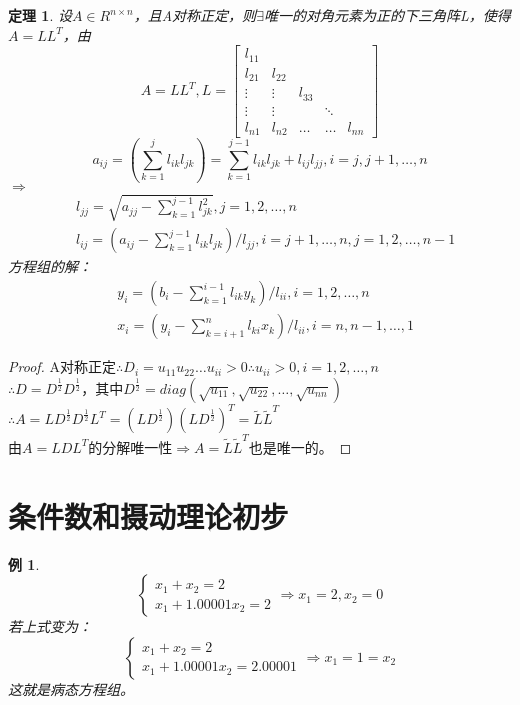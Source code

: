 \documentclass[a4paper]{article}
\newtheorem{theorem}{定理}[section]
\newtheorem{example}{例}[section]
\begin{document}
\begin{theorem}
  设$A\in R^{n\times n}$，且A对称正定，则$\exists$唯一的对角元素为正的下三角阵L，使得$A=LL^T$，由
  $$A=LL^T, L = \left[
    \begin{matrix}
      l_{11} \\
      l_{21} & l_{22} \\
      \vdots & \vdots & l_{33} \\
      \vdots & \vdots & &\ddots \\
      l_{n1} & l_{n2} & \dots & \dots & l_{nn}
    \end{matrix}
    \right]$$
  $$a_{ij}=(\sum_{k=1}^jl_{ik}l_{jk})=\sum^{j-1}_{k=1}l_{ik}l_{jk}+l_{ij}l_{jj}, i=j,j+1,\dots,n $$
  $\Rightarrow$
  \begin{align}
    &l_{jj} = \sqrt{a_{jj}-\sum^{j-1}_{k=1}l^2_{jk}}, j=1,2,\dots, n \\
    &l_{ij} = (a_{ij}-\sum^{j-1}_{k=1}l_{ik}l_{jk})/l_{jj}, i=j+1, \dots, n, j=1,2, \dots, n-1 
  \end{align}
  方程组的解：
  \begin{align}
    &y_i = (b_i-\sum^{i-1}_{k=1}l_{ik}y_k)/l_{ii}, i=1,2,\dots, n \\
    &x_i = (y_i-\sum^n_{k=i+1}l_{ki}x_k)/l_{ii}, i=n,n-1,\dots, 1
  \end{align}
\end{theorem}

\begin{proof}
  A对称正定$\therefore D_i=u_{11}u_{22}\dots u_{ii}>0 \therefore u_{ii}>0, i=1,2,\dots,n $ \\
  $\therefore D = D^\frac{1}{2}D^\frac{1}{2}$，其中$D^\frac{1}{2} = diag(\sqrt{u_{11}}, \sqrt{u_{22}}, \dots, \sqrt{u_{nn}}) $ \\
  $\therefore A= LD^\frac{1}{2}D^\frac{1}{2}L^T = (LD^\frac{1}{2})(LD^\frac{1}{2})^T = \widetilde{L}\widetilde{L}^T $\\
  由$A=LDL^T$的分解唯一性$\Rightarrow A=\widetilde{L}\widetilde{L}^T$也是唯一的。
\end{proof}

\section{条件数和摄动理论初步}
\begin{example}
  $$\left\{
    \begin{array}{lr}
      x_1 + x_2=2\\
      x_1+1.00001x_2=2
    \end{array}
    \right.
    \Rightarrow x_1=2, x_2=0$$
    若上式变为：
    $$
    \left\{
    \begin{array}{lr}
      x_1 + x_2=2\\
      x_1+1.00001x_2=2.00001
    \end{array}
    \right.
    \Rightarrow x_1=1=x_2
    $$
    这就是病态方程组。
\end{example}
\end{document}
